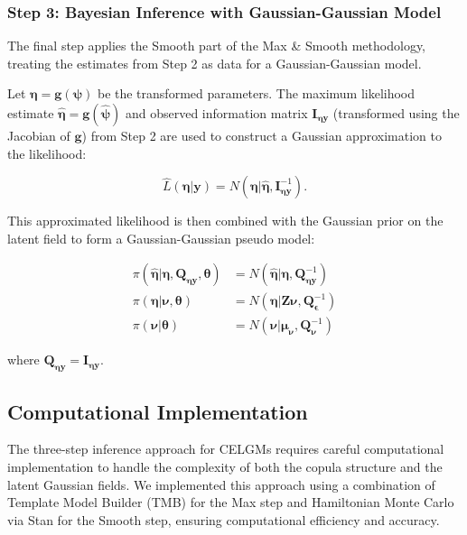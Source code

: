 \subsubsection{Step 3: Bayesian Inference with Gaussian-Gaussian Model}
The final step applies the Smooth part of the Max \& Smooth methodology, treating the estimates from Step 2 as data for a Gaussian-Gaussian model.

Let $\boldsymbol{\eta} = \mathbf{g}(\boldsymbol{\psi})$ be the transformed parameters. The maximum likelihood estimate $\hat{\boldsymbol{\eta}} = \mathbf{g}(\hat{\boldsymbol{\psi}})$ and observed information matrix $\mathbf{I}_{\boldsymbol{\eta}\mathbf{y}}$ (transformed using the Jacobian of $\mathbf{g}$) from Step 2 are used to construct a Gaussian approximation to the likelihood:

\begin{equation}
    \hat{L}(\boldsymbol{\eta}|\mathbf{y}) = N(\boldsymbol{\eta}|\hat{\boldsymbol{\eta}}, \mathbf{I}_{\boldsymbol{\eta}\mathbf{y}}^{-1}).
\end{equation}

This approximated likelihood is then combined with the Gaussian prior on the latent field to form a Gaussian-Gaussian pseudo model:

\begin{align}
    \pi(\hat{\boldsymbol{\eta}}|\boldsymbol{\eta}, \mathbf{Q}_{\boldsymbol{\eta}\mathbf{y}}, \boldsymbol{\theta}) &= N(\hat{\boldsymbol{\eta}}|\boldsymbol{\eta}, \mathbf{Q}_{\boldsymbol{\eta}\mathbf{y}}^{-1}) \\
    \pi(\boldsymbol{\eta}|\boldsymbol{\nu}, \boldsymbol{\theta}) &= N(\boldsymbol{\eta}|\mathbf{Z}\boldsymbol{\nu}, \mathbf{Q}_{\boldsymbol{\epsilon}}^{-1}) \\
    \pi(\boldsymbol{\nu}|\boldsymbol{\theta}) &= N(\boldsymbol{\nu}|\boldsymbol{\mu}_{\boldsymbol{\nu}}, \mathbf{Q}_{\boldsymbol{\nu}}^{-1})
\end{align}

where $\mathbf{Q}_{\boldsymbol{\eta}\mathbf{y}} = \mathbf{I}_{\boldsymbol{\eta}\mathbf{y}}$.

\subsection{Computational Implementation}
The three-step inference approach for CELGMs requires careful computational implementation to handle the complexity of both the copula structure and the latent Gaussian fields. We implemented this approach using a combination of Template Model Builder (TMB) for the Max step and Hamiltonian Monte Carlo via Stan for the Smooth step, ensuring computational efficiency and accuracy.

